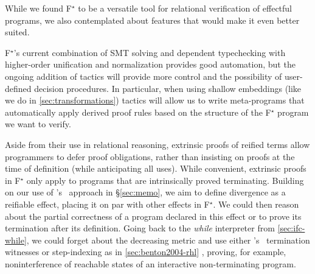 \documentclass[sigplan,screen]{acmart}\settopmatter{}
\newcommand\citepos[1]{\citeauthor{#1}'s\ \citeyear{#1}}
\newcommand\fstar{F$^\star$\xspace}
\newcommand{\comm}[3]{\ifcheckpagebudget\else\ifdraft{\maybecolor{#1}[#2: #3]}\fi\fi}
\newcommand{\ch}[1]{\comm{teal}{CH}{#1}}
\newcommand{\km}[1]{\comm{purple}{KM}{#1}}
\begin{document}
While we found \fstar to be a versatile tool for relational
verification of effectful programs, we also contemplated about
features that would make it even better suited.

 \fstar's current combination of SMT
solving and dependent typechecking \iffull with higher-order unification and
normalization \fi provides good automation, but the ongoing addition of tactics
will provide more control and the possibility of
user-defined decision procedures.
%
In particular, when using shallow embeddings (like we do in
\autoref{sec:transformations}) tactics will allow us to write
meta-programs that automatically apply derived proof rules
based on the structure of the \fstar{} program we want to verify.



%
Aside from their use in relational reasoning, extrinsic proofs of
reified terms allow programmers to defer proof obligations, rather
than insisting on proofs at the time of
definition (while anticipating all uses).
%
While convenient, extrinsic proofs in \fstar only apply to programs
that are intrinsically proved terminating.
%
Building on our use of \citepos{McBride15} approach
in \S\ref{sec:memo}, we aim to define divergence as a reifiable
effect, placing it on par with other effects in \fstar.
%
We could then reason about the partial correctness of a program
declared in this effect or to prove its termination after its
definition.
%
Going back to the \emph{while} interpreter from
\autoref{sec:ifc-while}, we could forget about the decreasing metric and use
either \citepos{BoveC05} termination witnesses or step-indexing
as in \autoref{sec:benton2004-rhl} \cite{OwensMKT16,AminR17},
proving, for example, noninterference of reachable states
of an interactive non-terminating program.
\end{document}
